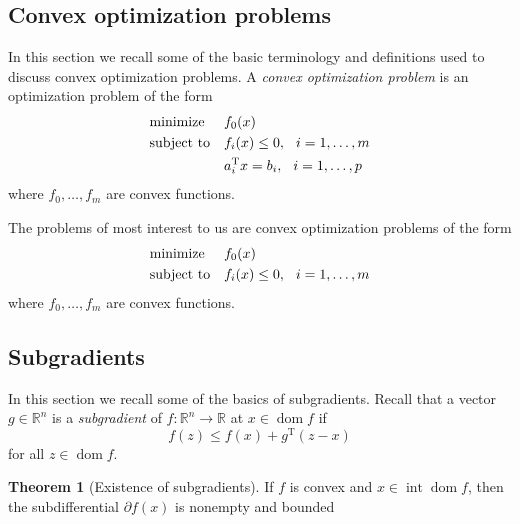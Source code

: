 \documentclass[11pt]{amsart}
\theoremstyle{definition}
\newtheorem{theorem}{Theorem}[section]
\theoremstyle{remark}
\newcommand{\gap}{\hspace*{0.25cm}}
\newcommand{\transpose}{\text{T}}
\DeclareMathOperator{\interior}{int}
\DeclareMathOperator{\domain}{dom}
\begin{document}
   \subsection{Convex optimization problems}
        In this section we recall some of the basic terminology and definitions used to discuss convex optimization problems. A \emph{convex optimization problem} is an optimization problem of the form 
        \begin{equation}\label{e:convex_opt_problem}
            \begin{aligned}
            & {\text{minimize}} && f_0(x) \\
            & \text{subject to} && f_i(x) \leq 0, \gap i = 1, \dots, m \\
            &                   && a_i^\transpose x = b_i, \gap i = 1, \dots, p
            \end{aligned}
        \end{equation}
        where $f_0, \dots, f_m$ are convex functions. 

        The problems of most interest to us are convex optimization problems of the form  
        \begin{equation}\label{e:convex_opt_problem_of_interest}
            \begin{aligned}
            & {\text{minimize}} && f_0(x) \\
            & \text{subject to} && f_i(x) \leq 0, \gap i = 1, \dots, m
            \end{aligned}
        \end{equation}
        where $f_0, \dots, f_m$ are convex functions. 

    \subsection{Subgradients}
        In this section we recall some of the basics of subgradients. Recall that a vector $g \in \mathbb{R}^n$ is a \emph{subgradient} of $f: \mathbb{R}^n \to \mathbb{R}$ at $x \in \domain f$ if 
        \begin{equation}\label{d:subgrad}
            f(z) \leq f(x) + g^\transpose(z-x)
        \end{equation}
        for all $z \in \domain f$.

        \begin{theorem}[Existence of subgradients]\label{t:existence_of_subgrads}
            If $f$ is convex and $x \in \interior \domain f$, then the subdifferential $\partial f(x)$ is nonempty and bounded 
        \end{theorem}
\end{document}
